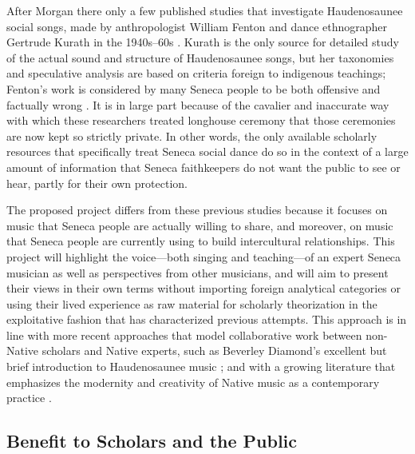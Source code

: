 \documentclass{neh}
\begin{document}
After Morgan there only a few published studies that investigate Haudenosaunee
social songs, made by anthropologist William Fenton and dance ethnographer
Gertrude Kurath in the 1940s--60s
\Autocites{FentonKurath:EagleDance}{Kurath:IroquoisMusic}{Caldwell:Kurath}.
Kurath is the only source for detailed study of the actual sound and structure
of Haudenosaunee songs, but her taxonomies and speculative analysis are based
on criteria foreign to indigenous teachings; Fenton's work is considered by
many Seneca people to be both offensive and factually wrong
\Autocite{McCarthy:Iroquoianist}.
It is in large part because of the cavalier and inaccurate way with which
these researchers treated longhouse ceremony that those ceremonies are now
kept so strictly private.
In other words, the only available scholarly resources that specifically treat
Seneca social dance do so in the context of a large amount of information that
Seneca faithkeepers do not want the public to see or hear, partly for their
own protection.

The proposed project differs from these previous studies because it focuses on
music that Seneca people are actually willing to share, and moreover, on music
that Seneca people are currently using to build intercultural relationships.
This project will highlight the voice---both singing and teaching---of an
expert Seneca musician as well as perspectives from other musicians, and will
aim to present their views in their own terms without importing foreign
analytical categories or using their lived experience as raw material for
scholarly theorization in the exploitative fashion that has characterized
previous attempts.
This approach is in line with more recent approaches that model collaborative
work between non-Native scholars and Native experts, such as Beverley
Diamond's excellent but brief introduction to Haudenosaunee music 
\Autocite{Diamond:NativeAmericanNortheast}; 
and with a growing literature that emphasizes the modernity and creativity of
Native music as a contemporary practice
\Autocites
{Browner:FirstNations}
{Browner:Heartbeat}
{LevineRobinson:MusicModernity}.

\subsection{Benefit to Scholars and the Public}
\end{document}
